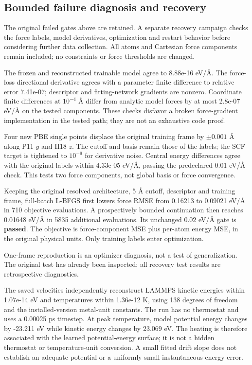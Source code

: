 \subsection{Bounded failure diagnosis and recovery}

The original failed gates above are retained. A separate recovery campaign checks the force labels, model derivatives, optimization and restart behavior before considering further data collection. All atoms and Cartesian force components remain included; no constraints or force thresholds are changed.

The frozen and reconstructed trainable model agree to 8.88e-16 eV/\AA. The force-loss directional derivative agrees with a parameter finite difference to relative error 7.41e-07; descriptor and fitting-network gradients are nonzero. Coordinate finite differences at $10^{-4}$ \AA{} differ from analytic model forces by at most 2.8e-07 eV/\AA{} on the tested components. These checks disfavor a broken force-gradient implementation in the tested path; they are not an exhaustive code proof.

Four new PBE single points displace the original training frame by $\pm0.001$ \AA{} along P11-$y$ and H18-$z$. The cutoff and basis remain those of the labels; the SCF target is tightened to $10^{-9}$ for derivative noise. Central energy differences agree with the original labels within 4.33e-05 eV/\AA, passing the predeclared 0.01 eV/\AA{} check. This tests two force components, not global basis or force convergence.

Keeping the original resolved architecture, 5 \AA{} cutoff, descriptor and training frame, full-batch L-BFGS first lowers force RMSE from 0.16213 to 0.09021 eV/\AA{} in 710 objective evaluations. A prospectively bounded continuation then reaches 0.01648 eV/\AA{} in 5835 additional evaluations. Its unchanged 0.02 eV/\AA{} gate is \textbf{passed}. The objective is force-component MSE plus per-atom energy MSE, in the original physical units. Only training labels enter optimization.

One-frame reproduction is an optimizer diagnosis, not a test of generalization. The original test has already been inspected; all recovery test results are retrospective diagnostics.

The saved velocities independently reconstruct LAMMPS kinetic energies within 1.07e-14 eV and temperatures within 1.36e-12 K, using 138 degrees of freedom and the installed-version metal-unit constants. The run has no thermostat and uses a 0.00025 ps timestep. At peak temperature, model potential energy changes by -23.211 eV while kinetic energy changes by 23.069 eV. The heating is therefore associated with the learned potential-energy surface; it is not a hidden thermostat or temperature-unit conversion. A small fitted drift slope does not establish an adequate potential or a uniformly small instantaneous energy error.


